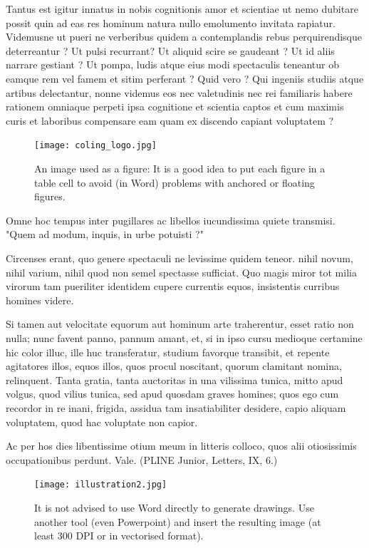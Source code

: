 \documentclass[10pt,a5paper,twoside]{article}
\begin{document}
Tantus est igitur innatus in nobis cognitionis amor et scientiae ut nemo dubitare possit quin ad eas res hominum natura nullo emolumento invitata rapiatur. Videmusne ut pueri ne verberibus quidem a contemplandis rebus perquirendisque deterreantur ? Ut pulsi recurrant? Ut aliquid scire se gaudeant ? Ut id aliis narrare gestiant ? Ut pompa, ludis atque eius modi spectaculis teneantur ob eamque rem vel famem et sitim perferant ? Quid vero ? Qui ingeniis studiis atque artibus delectantur, nonne videmus eos nec valetudinis nec rei familiaris habere rationem omniaque perpeti ipsa cognitione et scientia captos et cum maximis curis et laboribus compensare eam quam ex discendo capiant voluptatem ?
\newpage
\begin{figure}[htbp] 
\begin{center}
\texttt{[image: coling\_logo.jpg]}
\caption{An image used as a figure: It is a good idea to put each figure in a table cell to avoid (in Word) problems with anchored or floating figures.}
\label{image} %
\end{center} 
\end{figure} %
Omne hoc tempus inter pugillares ac libellos iucundissima quiete transmisi. "Quem ad modum, inquis, in urbe potuisti ?"

Circenses erant, quo genere spectaculi ne levissime quidem teneor. nihil novum, nihil varium, nihil quod non semel spectasse sufficiat. Quo magis miror tot milia virorum tam pueriliter identidem cupere currentis equos, insistentis curribus homines videre.

Si tamen aut velocitate equorum aut hominum arte traherentur, esset ratio non nulla; nunc favent panno, pannum amant, et, si in ipso cursu medioque certamine hic color illuc, ille huc transferatur, studium favorque transibit, et repente agitatores illos, equos illos, quos procul noscitant, quorum clamitant nomina, relinquent. Tanta gratia, tanta auctoritas in una vilissima tunica, mitto apud volgus, quod vilius tunica, sed apud quosdam graves homines; quos ego cum recordor in re inani, frigida, assidua tam insatiabiliter desidere, capio aliquam voluptatem, quod hac voluptate non capior.

Ac per hos dies libentissime otium meum in litteris colloco, quos alii otiosissimis occupationibus perdunt. Vale. (PLINE Junior, Letters, IX, 6.) 
\begin{figure}[htbp]
\begin{center} 
\texttt{[image: illustration2.jpg]} 
\caption{It is not advised to use Word directly to generate drawings. Use another tool (even Powerpoint) and insert the resulting image (at least 300 DPI or in vectorised format).}
\label{figure}
\end{center}
\end{figure} 
\end{document}
